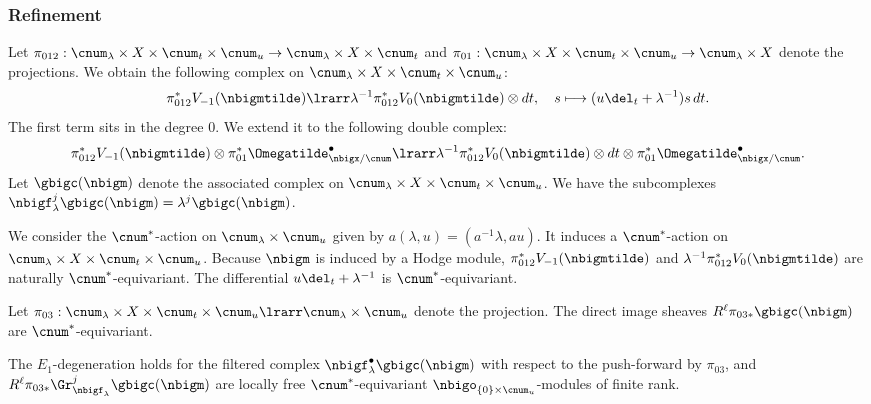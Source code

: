 \documentclass[a4,10pt]{article}
\begin{document}
\subsubsection{Refinement}

Let $\pi_{012}:\cnum_{\lambda}\times X\times\cnum_t\times\cnum_u
\to \cnum_{\lambda}\times X\times\cnum_t$
and
$\pi_{01}:\cnum_{\lambda}\times X\times\cnum_t\times\cnum_u
\to \cnum_{\lambda}\times X$
denote the projections.
We obtain the following complex
on $\cnum_{\lambda}\times X\times\cnum_t\times\cnum_u$:
\begin{equation}
\label{eq;23.4.1.1}
 \pi_{012}^{\ast}V_{-1}(\nbigmtilde)
 \lrarr
 \lambda^{-1}\pi_{012}^{\ast}V_0(\nbigmtilde)\otimes dt,
 \quad
 s\longmapsto (u\del_t+\lambda^{-1})s\,dt.
\end{equation}
The first term sits in the degree $0$.
We extend it to the following double complex:
\[
 \pi_{012}^{\ast}
 V_{-1}(\nbigmtilde)
 \otimes
 \pi_{01}^{\ast}
 \Omegatilde^{\bullet}_{\nbigx/\cnum}
 \lrarr
 \lambda^{-1}\pi_{012}^{\ast}
 V_0(\nbigmtilde)
 \otimes dt
 \otimes
 \pi_{01}^{\ast}
 \Omegatilde^{\bullet}_{\nbigx/\cnum}.
\]
Let $\gbigc(\nbigm)$ denote the associated complex
on $\cnum_{\lambda}\times X\times\cnum_t\times\cnum_u$.
We have the subcomplexes
$\nbigf_{\lambda}^j\gbigc(\nbigm)=\lambda^j\gbigc(\nbigm)$.

We consider the $\cnum^{\ast}$-action
on $\cnum_{\lambda}\times \cnum_u$
given by
$a(\lambda,u)=(a^{-1}\lambda,au)$.
It induces a $\cnum^{\ast}$-action
on $\cnum_{\lambda}\times X\times\cnum_t\times\cnum_u$.
Because $\nbigm$ is induced by a Hodge module,
$\pi_{012}^{\ast}V_{-1}(\nbigmtilde)$
and
$\lambda^{-1}\pi_{012}^{\ast}V_0(\nbigmtilde)$
are naturally $\cnum^{\ast}$-equivariant.
The differential
$u\del_t+\lambda^{-1}$ is $\cnum^{\ast}$-equivariant.

Let $\pi_{03}:\cnum_{\lambda}\times X\times\cnum_t\times\cnum_u
\lrarr \cnum_{\lambda}\times\cnum_u$
denote the projection.
The direct image sheaves
$R^{\ell}\pi_{03\ast}\gbigc(\nbigm)$
are $\cnum^{\ast}$-equivariant.

\begin{thm}
\label{thm;23.3.29.4}
The $E_1$-degeneration holds for
the filtered complex 
$\nbigf_{\lambda}^{\bullet}\gbigc(\nbigm)$
with respect to the push-forward by $\pi_{03}$,
and
$R^{\ell}\pi_{03\ast}
\Gr^j_{\nbigf_{\lambda}}\gbigc(\nbigm)$
are locally free
$\cnum^{\ast}$-equivariant $\nbigo_{\{0\}\times \cnum_u}$-modules
of finite rank.
\end{thm}
\end{document}
